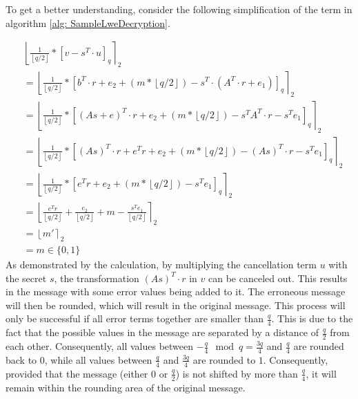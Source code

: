 To get a better understanding, consider the following simplification of the term in algorithm \ref{alg: SampleLweDecryption}.

\begin{align*}
   & \left\lfloor \frac{1}{\left\lfloor q/2\right\rfloor}*\left[v-s^T \cdot u\right]_q\right\rceil _2                                                                                     \\
   & = \left\lfloor \frac{1}{\left\lfloor q/2\right\rfloor}*\left[b^T \cdot r + e_2 + (m*\left\lfloor q/2\right\rfloor)-s^T \cdot (A^T \cdot r + e_1)\right]_q \right\rceil _2             \\
   & = \left\lfloor \frac{1}{\left\lfloor q/2\right\rfloor}*\left[(As+e)^T \cdot r + e_2 + (m*\left\lfloor q/2\right\rfloor)-s^T A^T \cdot r - s^T e_1\right]_q \right\rceil _2            \\
   & = \left\lfloor \frac{1}{\left\lfloor q/2\right\rfloor}*\left[(As)^T \cdot r + e^Tr+ e_2 + (m*\left\lfloor q/2\right\rfloor)-(As)^T \cdot r - s^T e_1\right]_q\right\rceil _2         \\
   & = \left\lfloor \frac{1}{\left\lfloor q/2\right\rfloor}*\left[e^Tr+ e_2 + (m*\left\lfloor q/2\right\rfloor)- s^T e_1\right]_q\right\rceil _2                                          \\
   & = \left\lfloor \frac{e^Tr}{\left\lfloor q/2\right\rfloor}+ \frac{e_2 }{\left\lfloor q/2\right\rfloor}+ m - \frac{s^T e_1}{\left\lfloor q/2\right\rfloor}\right\rceil _2 \\
   & = \left\lfloor m' \right\rceil _2                                                                                                                                       \\
   & = m \in \{0,1\}
\end{align*}
As demonstrated by the calculation, by multiplying the cancellation term $u$ with the secret $s$, the transformation $(As)^T \cdot r$ in $v$ can be canceled out. This results in the message with some error values being added to it. The erroneous message will then be rounded, which will result in the original message. This process will only be successful if all error terms together are smaller than $\frac{q}{4}$. This is due to the fact that the possible values in the message are separated by a distance of $\frac{q}{2}$ from each other. Consequently, all values between $-\frac{q}{4}\mod q=\frac{3q}{4}$ and $\frac{q}{4}$ are rounded back to $0$, while all values between $\frac{q}{4}$ and $\frac{3q}{4}$ are rounded to $1$. Consequently, provided that the message (either $0$ or $\frac{q}{2}$) is not shifted by more than $\frac{q}{4}$, it will remain within the rounding area of the original message.

